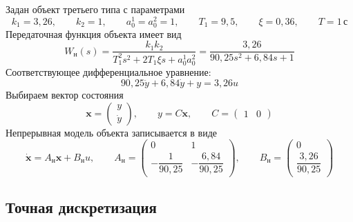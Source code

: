 Задан объект третьего типа с параметрами
\begin{equation}
  k_1=3{,}26,\qquad k_2=1,\qquad
  a_0^1=a_0^2=1,\qquad T_1=9{,}5,\qquad
  \xi=0{,}36,\qquad T=1\,\text{с}
  \label{eq:plant-data}
\end{equation}
Передаточная функция объекта имеет вид
\begin{equation}
  W_{\text{н}}(s)
  =\frac{k_1k_2}{T_1^2s^2+2T_1\xi s+a_0^1a_0^2}
  =\frac{3{,}26}{90{,}25s^2+6{,}84s+1}
  \label{eq:continuous-transfer}
\end{equation}
Соответствующее дифференциальное уравнение:
\begin{equation}
  90{,}25\ddot y+6{,}84\dot y+y=3{,}26u
  \label{eq:continuous-equation}
\end{equation}
Выбираем вектор состояния
\begin{equation}
  \bm x=\begin{pmatrix}y\\\dot y\end{pmatrix},
  \qquad y=C\bm x,\qquad C=\begin{pmatrix}1&0\end{pmatrix}
  \label{eq:state-choice}
\end{equation}
Непрерывная модель объекта записывается в виде
\begin{equation}
  \dot{\bm x}=A_{\text{н}}\bm x+B_{\text{н}}u,
  \qquad
  A_{\text{н}}=
  \begin{pmatrix}
    0&1\\
    -\dfrac{1}{90{,}25}&-\dfrac{6{,}84}{90{,}25}
  \end{pmatrix},
  \qquad
  B_{\text{н}}=\begin{pmatrix}0\\\dfrac{3{,}26}{90{,}25}\end{pmatrix}
  \label{eq:continuous-state-space}
\end{equation}

\subsection{Точная дискретизация}

